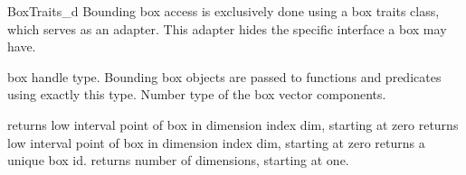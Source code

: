 
\ccRefPageBegin
\begin{ccRefConcept}{BoxTraits_d}
Bounding box access is exclusively done using a box traits class, which serves as an adapter. This adapter hides the specific interface a box may have.

\ccTypes
{} {box handle type. Bounding box objects are passed to functions and predicates using exactly this type.}
  {Number type of the box vector components.}

\ccOperations
{} {returns low interval point of box in dimension index dim, starting at zero}
 {returns low interval point of box in dimension index dim, starting at zero}
 {returns a unique box id. }
 {returns number of dimensions, starting at one.}

\ccHasModels
{}

\end{ccRefConcept}